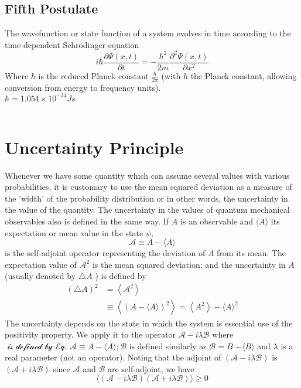 \subsection{Fifth Postulate}
The wavefunction or state function of a system evolves in time according to the time-dependent Schrödinger equation
$$
i \hbar \frac{\partial\Psi(x,t)}{\partial t}=- \frac{\hbar^{2}}{2m} \dfrac{\partial^2 \Psi(x,t)}{\partial x^2 }
$$
Where $\hbar$ is the reduced Planck constant $\frac{h}{ 2 \pi}$ (with $h$ the Planck constant, allowing conversion from energy to frequency units).\\
$\hbar=1.054 \times 10^{-34}Js$\\\\
\section{Uncertainty Principle}
Whenever we have some quantity which can assume several values with various probabilities, it is customary to use the mean squared deviation as a measure of the 'width' of the probability distribution or in other words, the uncertainty in the value of the quantity. The uncertainty in the values of quantum mechanical observables also is defined in the same way. If $A$ is an obscrvable and $\langle A\rangle$ its expectation or mean value in the state $\psi$,\\
$$\mathcal{A} \equiv A-\langle A\rangle$$
is the self-adjoint operator representing the deviation of $A$ from its mean. The expectation value of $\mathcal{A}^{2}$ is the mean squared deviation; and the uncertainty in $A$ (usually denoted by $\triangle A$ ) is defined by
$$
\begin{aligned}
(\triangle A)^{2} &=\left\langle \mathcal{A}^{2}\right\rangle \\
& \equiv\left\langle(A-\langle A\rangle)^{2}\right\rangle=\left\langle A^{2}\right\rangle-\langle A\rangle^{2}
\end{aligned}
$$
 The uncertainty depends on the state  in which the system is essential use of the positivity property. We apply it to the operator $\mathcal{A}-i \lambda \mathcal{B}$ where $\mathcal{\text { is defined by Eq. }}\mathcal{A} \equiv A-\langle A\rangle ; \mathcal{B}$ is defined similarly as $\mathcal{B}=B$ $-\langle B\rangle$ and $\lambda$ is a real parameter (not an operator). Noting that the adjoint of $(\mathcal{A}-i \lambda \mathcal{B})$ is $(\mathcal{A}+i \lambda \mathcal{B})$ since $\mathcal{A}$ and $\mathcal{B}$ are self-adjoint, we have 
 $$
 \langle(\mathcal{A}-i \lambda \mathcal{B})(\mathcal{A}+i \lambda \mathcal{B})\rangle \geqslant 0
 $$
